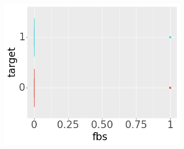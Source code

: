 \begin{figure}[b]
\begin{subfigure}[b]{0.32\textwidth}
         \includegraphics[width=\textwidth]{plots/target-fbs}
     \end{subfigure}


\end{figure}
